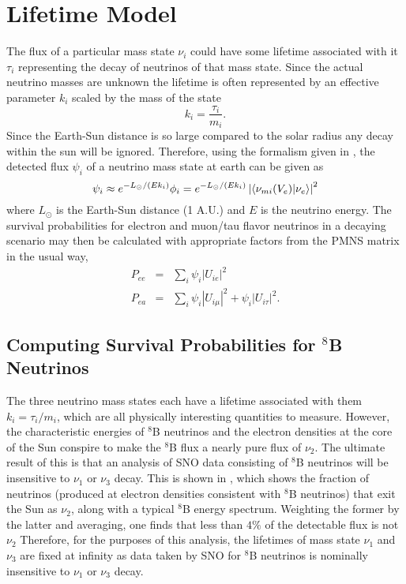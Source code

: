 \section{Lifetime Model}
\label{lifetime_model}

The flux of a particular mass state $\nu_i$ could have some lifetime associated with it $\tau_i$ representing the decay of neutrinos of that mass state.
Since the actual neutrino masses are unknown the lifetime is often represented by an effective parameter $k_i$ scaled by the mass of the state
\begin{equation}
k_i = \frac{\tau_i}{m_i}.
\end{equation}
Since the Earth-Sun distance is so large compared to the solar radius any decay within the sun will be ignored. 
Therefore, using the formalism given in , the detected flux $\psi_i$ of a neutrino mass state at earth can be given as 
\begin{equation}
\psi_i \approx  e^{-L_\odot / (E k_i)} \phi_i =  e^{-L_\odot / (E k_i)} \left| \braket{\nu_{m i}(V_e)}{\nu_e} \right|^2
\label{decay}
\end{equation}
where $L_\odot$ is the Earth-Sun distance (1 A.U.) and $E$ is the neutrino energy.
The survival probabilities for electron and muon/tau flavor neutrinos in a decaying scenario may then be calculated with appropriate factors from the PMNS matrix in the usual way,
\begin{equation}
\begin{array}{rcl}
P_{ee} & = & \sum_i \psi_i |U_{ie}|^2  \\
P_{ea} & = & \sum_i \psi_i |U_{i\mu}|^2 + \psi_i |U_{i\tau}|^2.
\end{array}
\label{survive}
\end{equation}

\subsection{Computing Survival Probabilities for $^8$B Neutrinos}

\label{montecarlo}

The three neutrino mass states each have a lifetime associated with them $k_i = \tau_i / m_i$, which are all physically interesting quantities to measure.
However, the characteristic energies of $^8$B neutrinos and the electron densities at the core of the Sun conspire to make the $^8$B flux a nearly pure flux of $\nu_2$.
The ultimate result of this is that an analysis of SNO data consisting of $^8$B neutrinos will be insensitive to $\nu_1$ or $\nu_3$ decay.
This is shown in , which shows the fraction of neutrinos (produced at electron densities consistent with $^8$B neutrinos) that exit the Sun as $\nu_2$, along with a typical $^8$B energy spectrum.
Weighting the former by the latter and averaging, one finds that less than $4\%$ of the detectable flux is not $\nu_2$
Therefore, for the purposes of this analysis, the lifetimes of mass state $\nu_1$ and $\nu_3$ are fixed at infinity as data taken by SNO for $^8$B neutrinos is nominally insensitive to $\nu_1$ or $\nu_3$ decay.

